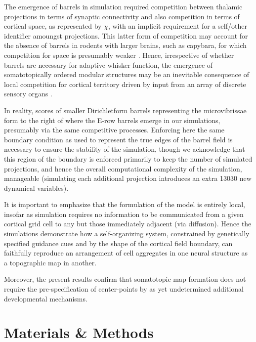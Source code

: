 \documentclass[9pt,lineno]{elife}
\newcommand{\cmnt}[1]{\textcolor{colcmnt}{#1}}
\begin{document}
The emergence of barrels in simulation required competition between thalamic
projections in terms of synaptic connectivity and also competition in terms of
cortical space, as represented by $\chi$, with an implicit requirement for a
self/other identifier amoungst projections. This latter form of competition may account for the absence of barrels in rodents with larger brains, such as
capybara, for which competition for space is presumably weaker
\citep{woolsey_comparative_1975}. Hence, irrespective of whether barrels are
necessary for adaptive whisker function, the emergence of somatotopically
ordered modular structures may be an inevitable consequence of local
competition for cortical territory driven by input from an array of discrete
sensory organs \citep{purves_iterated_1992}.

\cmnt{In reality, scores of smaller Dirichletform barrels representing the
  microvibrissae form to the right of where the E-row barrels emerge in our
  simulations, presumably via the same competitive processes. Enforcing here
  the same boundary condition as used to represent the true edges of the
  barrel field is necessary to ensure the stability of the simulation, though
  we acknowledge that this region of the boundary is enforced primarily to
  keep the number of simulated projections, and hence the overall
  computational complexity of the simulation, manageable (simulating each
  additional projection introduces an extra 13030 new dynamical
  variables).}

It is important to emphasize that the formulation of the model is entirely
local, insofar as simulation requires no information to be communicated from a
given cortical grid cell to any but those immediately adjacent (via
diffusion). Hence the simulations demonstrate how a self-organizing system,
constrained by genetically specified guidance cues and by the shape of the
cortical field boundary, can faithfully reproduce an arrangement of cell
aggregates in one neural structure as a topographic map in another.

Moreover, the present results confirm that somatotopic map formation does not
require the pre-specification of center-points by as yet undetermined
additional developmental mechanisms.

\section{Materials \& Methods}

%
%
\end{document}
